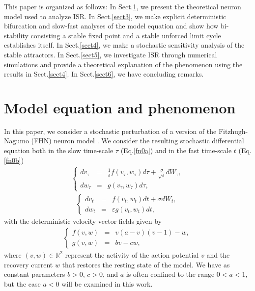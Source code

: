 This paper is organized as follows: In Sect.\ref{sect2}, we
present the theoretical neuron model used to analyze ISR.
In Sect.\ref{sect3}, we make explicit deterministic bifurcation
and slow-fast analyses of the model equation and show how
bi-stability consisting a stable fixed point and a stable unforced
limit cycle establishes itself. In Sect.\ref{sect4}, we make a
stochastic sensitivity analysis of the stable attractors. In
Sect.\ref{sect5}, we investigate ISR through numerical simulations
and provide a theoretical explanation of the phenomenon using the
results in Sect.\ref{sect4}. In
Sect.\ref{sect6}, we have concluding remarks.

\section{Model equation and phenomenon}\label{sect2}
\noindent
In this paper, we consider a stochastic perturbation of a version of the Fitzhugh-Nagumo (FHN) neuron model 
\cite{FitzHugh}. We consider the resulting stochastic differential equation both in
the slow time-scale $\tau$ (Eq.\eqref{fn0a}) and  in the fast
time-scale $t$ (Eq.\eqref{fn0b})
\begin{equation}\label{fn0a}
\begin{split}
\left\{\begin{array}{lcl}
dv_{\tau}&=&\frac{1}{\varepsilon}f(v_{\tau},w_{\tau})d\tau+\frac{\sigma}{\sqrt{\varepsilon}}dW_{\tau},\\
dw_{\tau}&=&g(v_{\tau},w_{\tau})d\tau,
\end{array}\right.
\end{split}
\end{equation}
\begin{equation}\label{fn0b}
\begin{split}
\left\{\begin{array}{lcl}
dv_{t}&=&f(v_{t},w_{t})dt+\sigma dW_{t},\\
dw_{t}&=&\varepsilon g(v_{t},w_{t})dt,
\end{array}\right.
\end{split}
\end{equation}
with the deterministic velocity vector fields given by
\begin{equation}\label{2}
\begin{split}
\left\{\begin{array}{lcl}
 f(v,w)&=&v(a-v)(v-1)-w, \\
 g(v,w)&=&bv-cw ,
 \end{array}\right.
\end{split}
\end{equation}
where $(v,w)\in\mathbb{R}^2$ represent the activity of the
action potential $v$ and the recovery current $w$ that restores
the resting state of the model. We have as constant parameters
$b>0$, $c>0$, and $a$ is often confined to the range $0<a<1$, but
the case $a < 0$ will be examined in this work.


